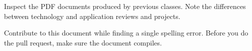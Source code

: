 \begin{exercise}
\label{E:Preface.1} 
Inspect the PDF documents produced by previous
classes. Note the differences between technology and application
reviews and projects. 
\end{exercise}

\begin{exercise}
\label{E:Preface.2}
 Contribute to this document while finding a
  single spelling error. Before you do the pull request, make sure the
  document compiles.
\end{exercise}


